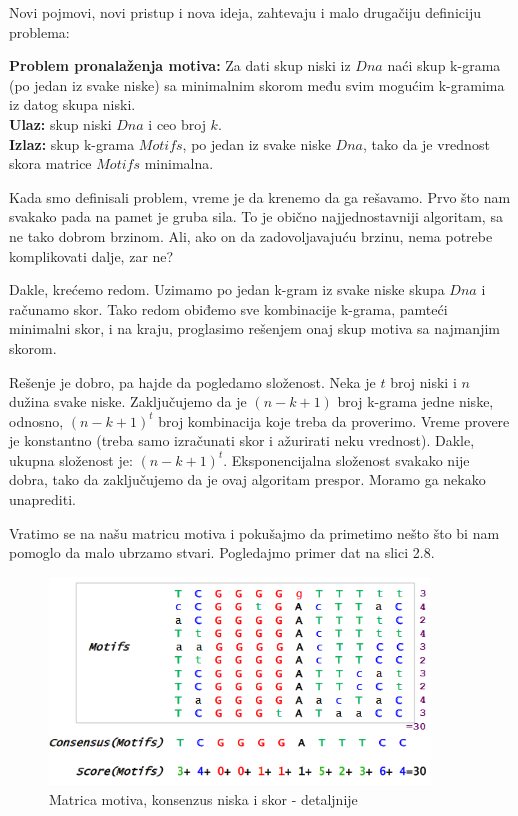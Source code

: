 Novi pojmovi, novi pristup i nova ideja, zahtevaju i malo drugačiju definiciju problema:

\begin{tcolorbox}
\textbf{Problem pronalaženja motiva:} Za dati skup niski iz $Dna$ naći skup k-grama (po jedan iz svake niske) sa minimalnim skorom među svim mogućim k-gramima iz datog skupa niski.\\
\textbf{Ulaz:} skup niski $Dna$ i ceo broj $k$.\\
\textbf{Izlaz:} skup k-grama $Motifs$, po jedan iz svake niske $Dna$, tako da je vrednost skora matrice $Motifs$ minimalna.
\end{tcolorbox}

Kada smo definisali problem, vreme je da krenemo da ga rešavamo.
Prvo što nam svakako pada na pamet je gruba sila. To je obično najjednostavniji algoritam, sa ne tako dobrom brzinom. Ali, ako on da zadovoljavajuću brzinu, nema potrebe komplikovati dalje, zar ne?

Dakle, krećemo redom. Uzimamo po jedan k-gram iz svake niske skupa $Dna$ i računamo skor. Tako redom obiđemo sve kombinacije k-grama, pamteći minimalni skor, i na kraju, proglasimo rešenjem onaj skup motiva sa najmanjim skorom.

Rešenje je dobro, pa hajde da pogledamo složenost. Neka je $t$ broj niski i $n$ dužina svake niske. Zaključujemo da je $(n-k+1)$ broj k-grama jedne niske, odnosno, 
$(n-k+1)^t$ broj kombinacija koje treba da proverimo. Vreme provere je konstantno (treba samo izračunati skor i ažurirati neku vrednost). Dakle, ukupna složenost je:
$(n-k+1)^t$. Eksponencijalna složenost svakako nije dobra, tako da zaključujemo da je ovaj algoritam prespor. Moramo ga nekako unaprediti.

Vratimo se na našu matricu motiva i pokušajmo da primetimo nešto što bi nam pomoglo da malo ubrzamo stvari. Pogledajmo primer dat na slici 2.8.

\begin{figure}[h]
\caption{Matrica motiva, konsenzus niska i skor - detaljnije}
\centering
\includegraphics[width=0.9\textwidth]{poglavlja/2/slike/32.PNG}
\end{figure}

